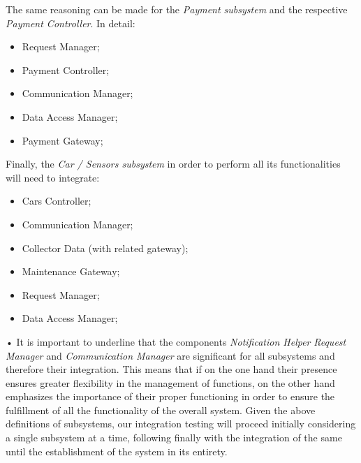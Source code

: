 \documentclass[10pt, a4paper,titlepage]{article}
\begin{document}
The same reasoning can be made for the \emph{Payment subsystem} and the respective \emph{Payment Controller}. In detail:
\begin{itemize}
\item Request Manager;
\item Payment Controller;
\item Communication Manager;
\item Data Access Manager;
\item Payment Gateway;
\end{itemize}
Finally, the \emph{Car / Sensors subsystem} in order to perform all its functionalities will need to integrate:
\begin{itemize}
\item Cars Controller;
\item Communication Manager;
\item Collector Data (with related gateway);
\item Maintenance Gateway;
\item Request Manager;
\item Data Access Manager;
\end{itemize}•
It is important to underline that the components \emph{Notification Helper} \emph{Request Manager} and \emph{Communication Manager} are significant for all subsystems and therefore their integration. This means that if on the one hand their presence ensures greater flexibility in the management of functions, on the other hand emphasizes the importance of their proper functioning in order to ensure the fulfillment of all the functionality of the overall system.
Given the above definitions of subsystems, our integration testing will proceed initially considering a single subsystem at a time, following finally with the integration of the same until the establishment of the system in its entirety.
\end{document}
